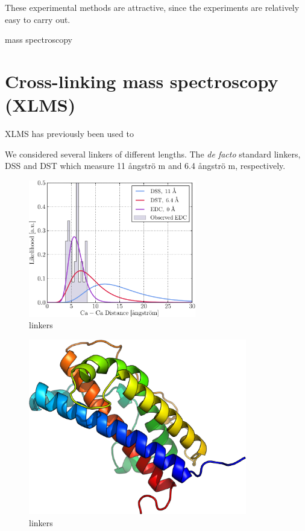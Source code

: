 These experimental methods are attractive, since the experiments are relatively easy to carry out.

mass spectroscopy 

\section{Cross-linking mass spectroscopy (XLMS)}


XLMS has previously been used to 

We considered several linkers of different lengths. The \textit{de facto} standard linkers, DSS and DST which measure 11 \aa ngstr\"o m and 6.4 \aa ngstr\"o m, respectively.

\begin{figure}
    \centering
    \includegraphics[width=0.65\textwidth]{figures/xcms/lognormal.pdf}
    \caption{linkers}
    \label{fig:linkers}
\end{figure}


\begin{figure}
    \centering
    \includegraphics[width=0.85\textwidth]{figures/hGH_rainbow.pdf}
    \caption{linkers}
    \label{fig:hGH_homology}
\end{figure}

